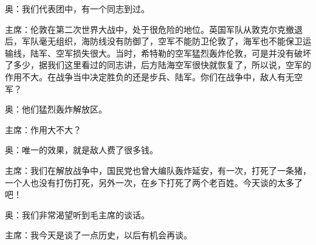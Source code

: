 奥：我们代表团中，有一个同志到过。

主席：伦敦在第二次世界大战中，处于很危险的地位。英国军队从敦克尔克撤退后，军队毫无组织，海防线没有防御了，空军不能防卫伦敦了，海军也不能保卫运输线，陆军、空军损失很大。当时，希特勒的空军猛烈轰炸伦敦，可是并没有破坏了多少，据我们这里看过的同志讲，后方陆海空军很快就恢复了，所以说，空军的作用不大。在战争当中决定胜负的还是步兵、陆军。你们在战争中，敌人有无空军？

奥：他们猛烈轰炸解放区。

主席：作用大不大？

奥：唯一的效果，就是敌人费了很多钱。

主席：我们在解放战争中，国民党也曾大编队轰炸延安，有一次，打死了一条猪，一个人也没有打伤打死，另外一次，在乡下打死了两个老百姓。今天谈的太多了吧！

奥：我们非常渴望听到毛主席的谈话。

主席：我今天是谈了一点历史，以后有机会再谈。

